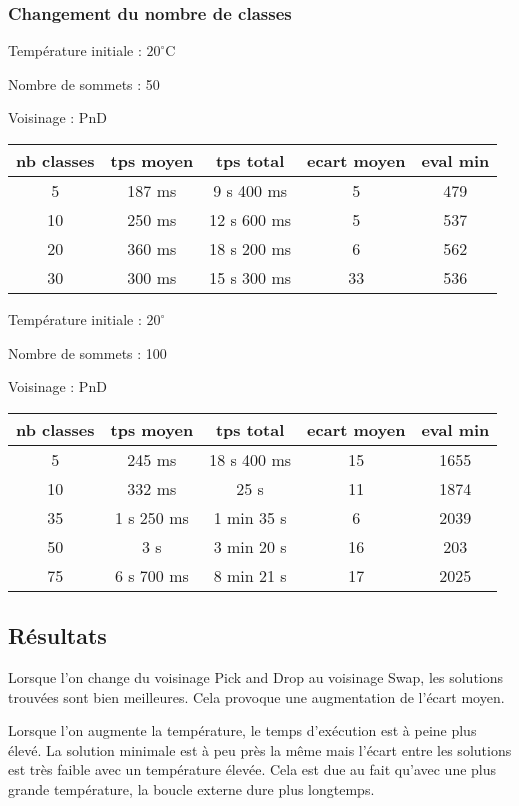 \documentclass[12pt]{article}
\begin{document}
\subsubsection*{Changement du nombre de classes}

Température initiale : $20^\circ$C

Nombre de sommets : 50 

Voisinage : PnD
\bigskip

\begin{tabular}{|c|c|c|c|c|}
	\hline 
	nb classes & tps moyen & tps total & ecart moyen & eval min\\
	\hline
	5 & 187 ms & 9 s 400 ms & 5 & 479 \\
	\hline
	10  &  250   ms   &  12  s   600 ms   &  5   &  537   \\
	\hline
	20 &  360   ms   &  18 s  200  ms    &  6   &   562  \\
	\hline
	30  &   300 ms  &  15 s  300  ms   &  33   &    536 \\
	\hline
\end{tabular}

\bigskip

Température initiale : $20^\circ$

Nombre de sommets : 100 

Voisinage : PnD
\bigskip

\begin{tabular}{|c|c|c|c|c|}
	\hline 
	nb classes & tps moyen & tps total & ecart moyen & eval min\\
	\hline
	5 & 245 ms & 18 s 400 ms & 15 & 1655 \\
	\hline
	10  &  332   ms   &  25  s  &  11   &  1874   \\
	\hline
	35  &   1 s 250 ms   & 1 min 35  s &   6  &   2039  \\
	\hline
	50  &   3 s & 3 min  20 s &   16 &   203  \\
	\hline
	75  &   6 s 700 ms & 8 min  21 s  &  17   &  2025   \\
	\hline
\end{tabular}


\subsection{Résultats}

Lorsque l’on change du voisinage Pick and Drop au voisinage Swap, les solutions trouvées sont bien meilleures. Cela provoque une augmentation de l'écart moyen.

Lorsque l’on augmente la température, le temps d’exécution est à peine plus élevé. La solution minimale est à peu près la même mais l’écart entre les solutions est très faible avec un température élevée. Cela est due au fait qu’avec une plus grande température, la boucle externe dure plus longtemps.
\end{document}
